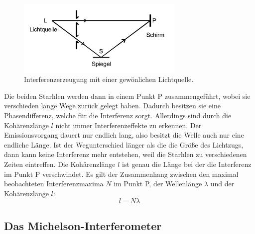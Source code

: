 \begin{figure}
    \centering
    \includegraphics[width=8cm]{data/abb1.png}
    \caption{Interferenzerzeugung mit einer gewönlichen Lichtquelle. \cite{sample}}
    \label{fig:abb1}
\end{figure}
\FloatBarrier
Die beiden Starhlen werden dann in einem Punkt P zusammengeführt, wobei sie verschieden lange Wege zurück gelegt haben.
Dadurch besitzen sie eine Phasendifferenz, welche für die Interferenz sorgt.
Allerdings sind durch die Kohärenzlänge $l$ nicht immer Interferenzeffekte zu erkennen.
Der Emissionsvorgang dauert nur endlich lang, also besitzt die Welle auch nur eine endliche Länge.
Ist der Wegunterschied länger als die die Größe des Lichtzugs, dann kann keine Interferenz mehr entstehen, weil die Starhlen zu verschiedenen Zeiten eintreffen.
Die Kohärenzlänge $l$ ist genau die Länge bei der die Interferenz im Punkt P verschwindet.
Es gilt der Zusammenhang zwischen den maximal beobachteten Interferenzmaxima $N$ im Punkt P, der Wellenlänge $\lambda$ und der Kohärenzlänge $l$:
\begin{equation}
    l = N \lambda
\end{equation}

\subsection{Das Michelson-Interferometer}
\label{sec:theo2}

